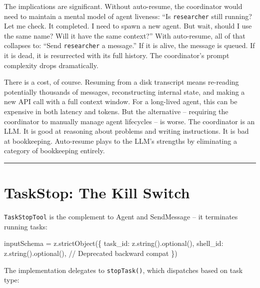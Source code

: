 \documentclass[
  english,
  11pt,
  letterpaper,
]{book}
\newenvironment{Shaded}{\begin{snugshade}}{\end{snugshade}}
\newcommand{\CommentTok}[1]{\textcolor[rgb]{0.37,0.37,0.37}{#1}}
\newcommand{\FunctionTok}[1]{\textcolor[rgb]{0.28,0.35,0.67}{#1}}
\newcommand{\NormalTok}[1]{\textcolor[rgb]{0.00,0.23,0.31}{#1}}
\newcommand{\OperatorTok}[1]{\textcolor[rgb]{0.37,0.37,0.37}{#1}}
\begin{document}
The implications are significant. Without auto-resume, the coordinator
would need to maintain a mental model of agent liveness: ``Is
\texttt{researcher} still running? Let me check. It completed. I need to
spawn a new agent. But wait, should I use the same name? Will it have
the same context?'' With auto-resume, all of that collapses to: ``Send
\texttt{researcher} a message.'' If it is alive, the message is queued.
If it is dead, it is resurrected with its full history. The
coordinator's prompt complexity drops dramatically.

There is a cost, of course. Resuming from a disk transcript means
re-reading potentially thousands of messages, reconstructing internal
state, and making a new API call with a full context window. For a
long-lived agent, this can be expensive in both latency and tokens. But
the alternative -- requiring the coordinator to manually manage agent
lifecycles -- is worse. The coordinator is an LLM. It is good at
reasoning about problems and writing instructions. It is bad at
bookkeeping. Auto-resume plays to the LLM's strengths by eliminating a
category of bookkeeping entirely.

\begin{center}\rule{0.5\linewidth}{0.5pt}\end{center}

\section{TaskStop: The Kill Switch}\label{taskstop-the-kill-switch}

\texttt{TaskStopTool} is the complement to Agent and SendMessage -- it
terminates running tasks:

\begin{Shaded}
\begin{Highlighting}[]
\NormalTok{inputSchema }\OperatorTok{=}\NormalTok{ z}\OperatorTok{.}\FunctionTok{strictObject}\NormalTok{(\{}
\NormalTok{  task\_id}\OperatorTok{:}\NormalTok{ z}\OperatorTok{.}\FunctionTok{string}\NormalTok{()}\OperatorTok{.}\FunctionTok{optional}\NormalTok{()}\OperatorTok{,}
\NormalTok{  shell\_id}\OperatorTok{:}\NormalTok{ z}\OperatorTok{.}\FunctionTok{string}\NormalTok{()}\OperatorTok{.}\FunctionTok{optional}\NormalTok{()}\OperatorTok{,}  \CommentTok{// Deprecated backward compat}
\NormalTok{\})}
\end{Highlighting}
\end{Shaded}

The implementation delegates to \texttt{stopTask()}, which dispatches
based on task type:
\end{document}
